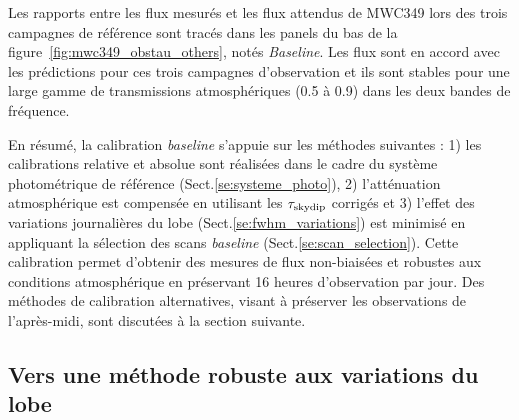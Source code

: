 Les rapports entre les flux mesurés et les flux attendus de MWC349
lors des trois campagnes de référence sont tracés dans les panels du
bas de la figure~\ref{fig:mwc349_obstau_others}, notés
\emph{Baseline}. Les flux sont en accord avec les prédictions pour ces
trois campagnes d'observation et ils sont stables pour une large gamme de
transmissions atmosphériques (0.5 à 0.9) dans les deux bandes de
fréquence.

En résumé, la calibration \emph{baseline} s'appuie sur les
méthodes suivantes : 1) les calibrations relative et absolue sont
réalisées dans le cadre du système photométrique de référence
(Sect.\ref{se:systeme_photo}), 2) l'atténuation atmosphérique est
compensée en utilisant les $\tau_{\rm{skydip}}$ corrigés et 3) l'effet
des variations journalières du lobe (Sect.\ref{se:fwhm_variations})
est minimisé en appliquant la sélection des scans \emph{baseline}
(Sect.\ref{se:scan_selection}). Cette calibration permet d'obtenir des
mesures de flux non-biaisées et robustes aux conditions atmosphérique
en préservant 16 heures d'observation par jour. Des méthodes de
calibration alternatives, visant à préserver les observations de
l'après-midi, sont discutées à la section suivante.

\subsection{Vers une méthode robuste aux variations du lobe}
\label{se:afternoon_calibration}

